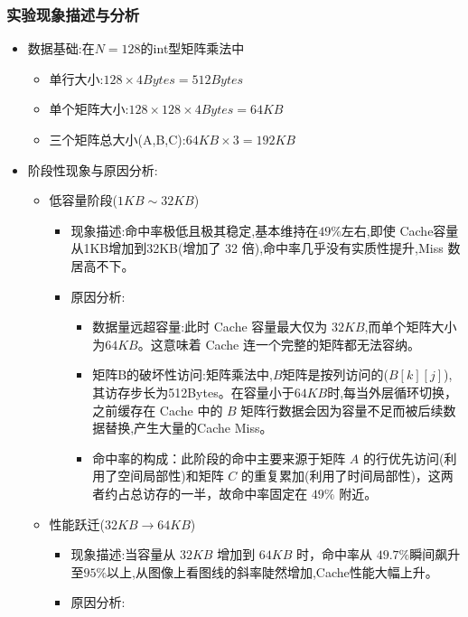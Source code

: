 \subsubsection{实验现象描述与分析}
\begin{itemize}
    \item 数据基础:在$N = 128$的int型矩阵乘法中
    \begin{itemize}
        \item 单行大小:$128 \times 4 Bytes = 512Bytes$
        \item 单个矩阵大小:$128 \times 128 \times 4 Bytes =64KB $
        \item 三个矩阵总大小(A,B,C):$64KB \times 3 = 192 KB$  
    \end{itemize}
    \item 阶段性现象与原因分析:
    \begin{itemize}
        \item 低容量阶段($1KB\sim 32KB$)
        \begin{itemize}
            \item 现象描述:命中率极低且极其稳定,基本维持在$49\%$左右,即使 Cache容量从1KB增加到32KB(增加了 32 倍),命中率几乎没有实质性提升,Miss 数居高不下。
            \item 原因分析:
            \begin{itemize}
                \item 数据量远超容量:此时 Cache 容量最大仅为 $32KB$,而单个矩阵大小为$64KB$。这意味着 Cache 连一个完整的矩阵都无法容纳。
                \item 矩阵B的破坏性访问:矩阵乘法中,$B$矩阵是按列访问的($B[k][j]$),其访存步长为512Bytes。在容量小于$64KB$时,每当外层循环切换，之前缓存在 Cache 中的 $B$ 矩阵行数据会因为容量不足而被后续数据替换,产生大量的Cache Miss。
                \item 命中率的构成：此阶段的命中主要来源于矩阵 $A$ 的行优先访问(利用了空间局部性)和矩阵 $C$ 的重复累加(利用了时间局部性)，这两者约占总访存的一半，故命中率固定在 $49\%$ 附近。
            \end{itemize}
        \end{itemize}
        \item 性能跃迁($32KB \to 64KB$)
        \begin{itemize}
            \item 现象描述:当容量从 $32KB$ 增加到 $64KB$ 时，命中率从 $49.7\%$瞬间飙升至$95\%$以上,从图像上看图线的斜率陡然增加,Cache性能大幅上升。
            \item 原因分析:
            \begin{itemize}

\end{itemize}
\end{itemize}
\end{itemize}
\end{itemize}
